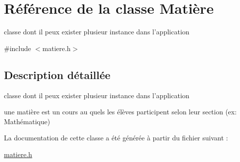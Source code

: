 \hypertarget{class_mati_xC3_xA8re}{\section{Référence de la classe Matière}
\label{class_mati_xC3_xA8re}
}


classe dont il peux exister plusieur instance dans l'application  




{\ttfamily \#include $<$matiere.\+h$>$}



\subsection{Description détaillée}
classe dont il peux exister plusieur instance dans l'application 

une matière est un cours au quels les élèves participent selon leur section (ex\+: Mathématique) 

La documentation de cette classe a été générée à partir du fichier suivant \+:\begin{DoxyCompactItemize}
\item 
\hyperlink{matiere_8h}{matiere.\+h}\end{DoxyCompactItemize}
